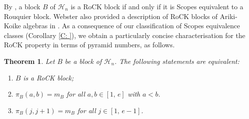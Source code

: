 \documentclass[11pt,a4paper,reqno]{amsart}
\numberwithin{equation}{section}
\theoremstyle{plain}
\newtheorem{thm}{Theorem}[section]
\theoremstyle{definition}
\theoremstyle{remark}
\numberwithin{equation}{section}
\newcommand{\HH}{\mathcal{H}}
\begin{document}
By \cite[Proposition~4.6]{Webster}, a block $B$ of $\HH_n$ is a RoCK block if and only if it is Scopes equivalent to a Rouquier block. %
Webster also provided a description of RoCK blocks of Ariki-Koike algebras in \cite[Subsection 4.2]{Webster}.
As a consequence of our classification of Scopes equivalence classes (Corollary \ref{C: }), we obtain a particularly concise characterisation for the RoCK property in terms of pyramid numbers, as follows.

\begin{thm} \label{T:RoCK}
Let $B$ be a block of $\HH_n$. The following statements are equivalent:
\begin{enumerate}
\item 
$B$ is a RoCK block;
\item $\pi_B(a,b) = m_B$ for all $a,b \in [1,\,e]$ with $a< b$.
\item $\pi_B(j,j+1) = m_B$ for all $j \in [1,\,e-1]$.
\end{enumerate}
\end{thm}
\end{document}
